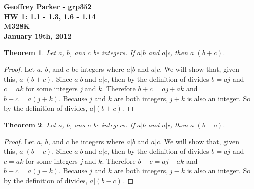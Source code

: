 \documentclass[12pt,leqno]{article}
\numberwithin{equation}{section}
\newtheorem{thm}{Theorem}[section]
\theoremstyle{definition}
\begin{document}
\thispagestyle{plain}
\begin{flushright}
\large{\textbf{Geoffrey Parker - grp352\\
HW 1: 1.1 - 1.3, 1.6 - 1.14\\
M328K \\
January 19th, 2012 \\}}
\end{flushright}

\markboth{}{} \setcounter{section}{0} \baselineskip=18pt

\setcounter{tocdepth}{4}



\setcounter{section}{1}
\begin{thm}
Let $a$, $b$, and $c$ be integers.  If $a|b$ and $a|c$, then $a|(b +
c)$.
\end{thm}

\begin{proof}[Proof]
Let $a$, $b$, and $c$ be integers where $a|b$ and $a|c$.  We will show that, given this, $a|(b + c)$.  Since $a|b$ and $a|c$, then by the definition of divides $b = aj$ and $c = ak$ for some integers $j$ and $k$.  Therefore $b + c = aj + ak$ and $b + c = a(j + k)$.  Because $j$ and $k$ are both integers, $j + k$ is also an integer.  So by the definition of divides, $a|(b + c)$.
\end{proof}

\begin{thm}
Let $a$, $b$, and $c$ be integers. If $a|b$ and $a|c$, then $a|(b -
c)$.
\end{thm}

\begin{proof}[Proof]
Let $a$, $b$, and $c$ be integers where $a|b$ and $a|c$.  We will show that, given this, $a|(b - c)$.  Since $a|b$ and $a|c$, then by the definition of divides $b = aj$ and $c = ak$ for some integers $j$ and $k$.  Therefore $b - c = aj - ak$ and $b - c = a(j - k)$.  Because $j$ and $k$ are both integers, $j - k$ is also an integer.  So by the definition of divides, $a|(b - c)$.\end{proof}
\end{document}
